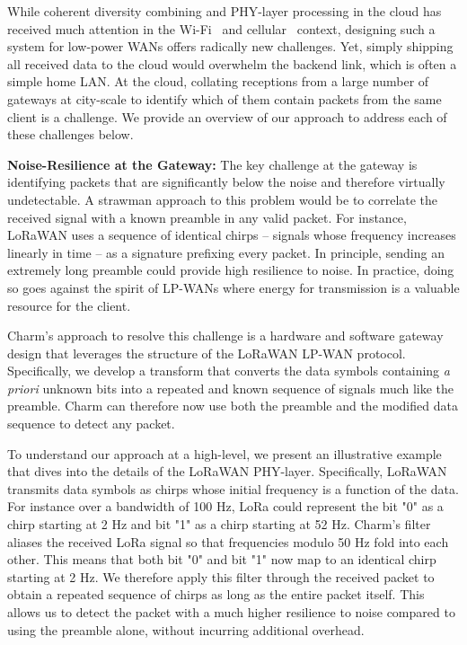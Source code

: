 While coherent diversity combining and PHY-layer processing in the cloud has
received much attention in the Wi-Fi~\cite{tan2009sam, xie2014scalable} and
cellular~\cite{checko2015cloud, wubben2014benefits} context, designing such a
system for low-power WANs offers radically new challenges.  Yet, simply shipping all received data to the
cloud would overwhelm the backend link, which is often  a simple home LAN. At
the cloud, collating receptions from a large number of gateways at city-scale
to identify which of them contain packets from the same client is a challenge.
We provide an overview of our approach to address each of these challenges
below. 


\noindent \textbf{Noise-Resilience at the Gateway:} The key challenge at the gateway is
identifying packets that are significantly below the noise and therefore
virtually undetectable. A strawman approach to this problem would be to
correlate the received signal with a known preamble in any valid packet. For
instance, LoRaWAN uses a sequence of identical chirps -- signals whose
frequency increases linearly in time -- as a signature prefixing every packet.
In principle, sending an extremely long preamble could provide high resilience
to noise. In practice, doing so goes against the spirit of LP-WANs where
energy for transmission is a valuable resource for the client.

Charm's approach to resolve this challenge is a hardware and software gateway
design that leverages the structure of the LoRaWAN LP-WAN protocol.
Specifically, we develop a transform that converts the data symbols containing
\textit{a priori} unknown bits into a repeated and known sequence of signals
much like the preamble. Charm can therefore now use both the preamble and the
modified data sequence to detect any packet.


To understand our approach at a high-level, we present an illustrative example
that dives into the details of the LoRaWAN PHY-layer. Specifically, LoRaWAN
transmits data symbols as chirps whose initial frequency is a function of the
data. For instance over a bandwidth of 100 Hz, LoRa could represent the bit
"0" as a chirp starting at 2 Hz and bit "1" as a chirp starting at 52 Hz.
Charm's filter aliases the received LoRa signal so that frequencies modulo 50
Hz fold into each other. This means that both bit "0" and bit "1" now map to
an identical chirp starting at 2 Hz. We therefore apply this filter through
the received packet to obtain a repeated sequence of chirps as long as the
entire packet itself. This allows us to detect the packet with a much higher
resilience to noise compared to using the preamble alone, without incurring
additional overhead.

